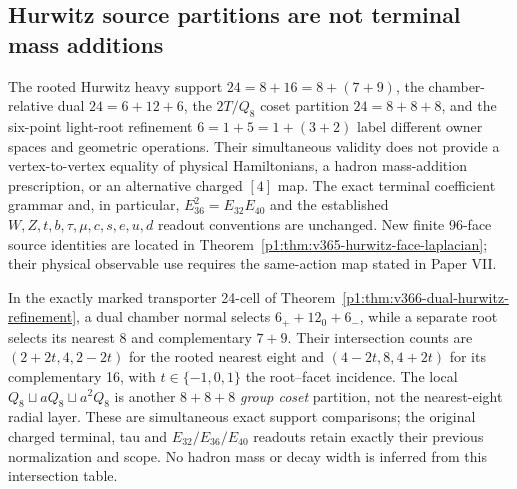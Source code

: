 \documentclass[12pt,a4paper]{article}
\begin{document}
\subsection{Hurwitz source partitions are not terminal mass additions}
\label{p5b:subsec:v365-hurwitz-terminal-scope}
The rooted Hurwitz heavy support $24=8+16=8+(7+9)$, the
chamber-relative dual $24=6+12+6$, the $2T/Q_8$ coset partition
$24=8+8+8$, and the six-point light-root refinement
$6=1+5=1+(3+2)$ label different owner spaces and geometric
operations.  Their simultaneous validity does not provide a
vertex-to-vertex equality of physical Hamiltonians, a hadron
mass-addition prescription, or an alternative charged $[4]$ map.
The exact terminal coefficient grammar and, in particular,
$E_{36}^{2}=E_{32}E_{40}$ and the established $W,Z,t,b,\tau,
\mu,c,s,e,u,d$ readout conventions are unchanged.  New finite
96-face source identities are located in
Theorem~\ref{p1:thm:v365-hurwitz-face-laplacian}; their physical
observable use requires the same-action map stated in Paper VII.


\begin{remark}
\label{p5b:rem:v366-hurwitz-chamber-refinement}
In the exactly marked transporter 24-cell of
Theorem~\ref{p1:thm:v366-dual-hurwitz-refinement}, a dual chamber
normal selects $6_++12_0+6_-$, while a separate root selects its
nearest $8$ and complementary $7+9$.  Their intersection counts
are $(2+2t,4,2-2t)$ for the rooted nearest eight and
$(4-2t,8,4+2t)$ for its complementary 16, with
$t\in\{-1,0,1\}$ the root--facet incidence.
The local $Q_8\sqcup aQ_8\sqcup a^2Q_8$ is another $8+8+8$
\emph{group coset} partition, not the nearest-eight radial layer.
These are simultaneous exact support comparisons; the original
charged terminal, tau and $E_{32}/E_{36}/E_{40}$ readouts retain
exactly their previous normalization and scope.  No hadron mass or
decay width is inferred from this intersection table.
\end{remark}


\end{document}
